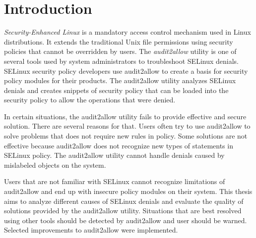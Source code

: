 \chapter{Introduction}

\emph{Security-Enhanced Linux} is a mandatory access control mechanism used in
Linux distributions. It extends the traditional Unix file permissions using
security policies that cannot be overridden by users. The \emph{audit2allow}
utility is one of several tools used by system administrators to troubleshoot
SELinux denials. SELinux security policy developers use audit2allow to create a
basis for security policy modules for their products.  The audit2allow utility
analyzes SELinux denials and creates snippets of security policy that can be
loaded into the security policy to allow the operations that were denied.

In certain situations, the audit2allow utility fails to provide effective and
secure solution. There are several reasons for that. Users often try to use
audit2allow to solve problems that does not require new rules in policy. Some
solutions are not effective because audit2allow does not recognize new types of
statements in SELinux policy. The audit2allow utility cannot handle denials
caused by mislabeled objects on the system.

Users that are not familiar with SELinux cannot recognize limitations of
audit2allow and end up with insecure policy modules on their system.
This thesis aims to analyze different causes of SELinux denials and evaluate the
quality of solutions provided by the audit2allow utility. Situations that are
best resolved using other tools should be detected by audit2allow and user
should be warned. Selected improvements to audit2allow were implemented.

